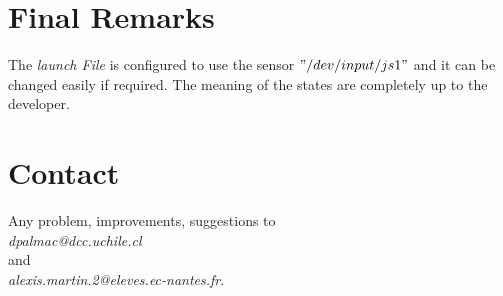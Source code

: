 \documentclass[letterpaper, openright, 11pt]{article}
\begin{document}
\section{Final Remarks}

The \textit{launch File} is configured to use the sensor $"/dev/input/js1"$ and it can be changed easily if required. The meaning of the states are completely up to the developer. 

\section{Contact}

Any problem, improvements, suggestions to\\
\textit{dpalmac@dcc.uchile.cl}\\
and\\
\textit{alexis.martin.2@eleves.ec-nantes.fr}.
\end{document}
